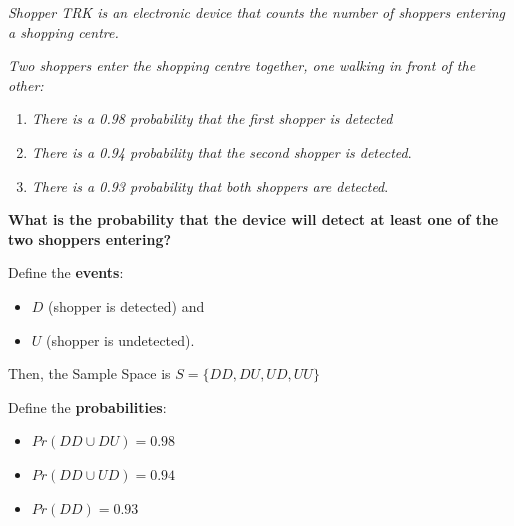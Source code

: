 \documentclass[notes=show,handout]{beamer}\usepackage[]{graphicx}\usepackage[]{color}
\begin{document}
\begin{frame}{\secname}
  \begin{example}
      \begin{footnotesize}
      \textit{Shopper TRK is an electronic device that counts the number of shoppers entering a shopping centre.}

      \textit{Two shoppers enter the shopping centre together, one walking in front of the other:}

      \begin{enumerate}
      \item \textit{There is a 0.98 probability that the first shopper is detected}
      \item \textit{There is a 0.94 probability that the second shopper is detected}.
      \item \textit{There is a 0.93 probability that both shoppers are detected}.
      \end{enumerate}
      \textbf{What is the probability that the device will detect at least one of the two shoppers entering?}
    \end{footnotesize}
  \end{example}
\end{frame}

\begin{frame}{\secname}
  \begin{example}
    \begin{footnotesize}
      Define the \textbf{events}:

      \begin{itemize}
      \item $D$ (shopper is detected) and
      \item $U$ (shopper is undetected).
      \end{itemize}

      Then, the Sample Space is $S=\{ DD, DU, UD, UU\}$

      Define the \textbf{probabilities}:
      \begin{itemize}
      \item $Pr(DD \cup DU) = 0.98$
      \item $Pr(DD \cup UD) = 0.94$
      \item $Pr(DD) = 0.93$
      \end{itemize}
    \end{footnotesize}
  \end{example}
\end{frame}
\end{document}
